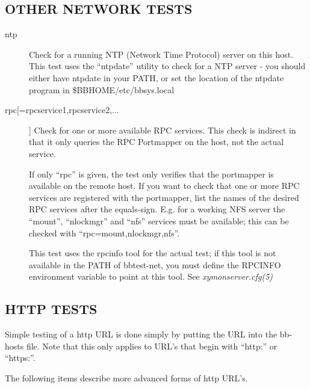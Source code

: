 \subsection{OTHER NETWORK TESTS}
\begin{description}
\item[ntp] Check for a running NTP (Network Time Protocol) server on
  this host. This test uses the ``ntpdate'' utility to check for a NTP
  server - you should either have ntpdate in your PATH, or set the
  location of the ntpdate program in \$BBHOME/etc/bbsys.local 


 

\item[rpc[=rpcservice1,rpcservice2,...]] Check for one or more
  available RPC services. This check is indirect in that it only
  queries the RPC Portmapper on the host, not the actual service. 


  If only ``rpc'' is given, the test only verifies that the portmapper
  is available on the remote host. If you want to check that one or
  more RPC services are registered with the portmapper, list the names
  of the desired RPC services after the equals-sign. E.g. for a
  working NFS server the ``mount'', ``nlockmgr'' and ``nfs'' services
  must be available; this can be checked with
  ``rpc=mount,nlockmgr,nfs''. 



  This test uses the rpcinfo tool for the actual test; if this tool is
  not available in the PATH of bbtest-net, you must define the RPCINFO
  environment variable to point at this tool. See
  \emph{xymonserver.cfg(5)}


\end{description}
\subsection{HTTP TESTS}
 Simple testing of a http URL is done simply by putting the URL into
 the bb-hosts file. Note that this only applies to URL's that begin
 with ``http:'' or ``https:''. 


  The following items describe more advanced forms of http URL's. 


